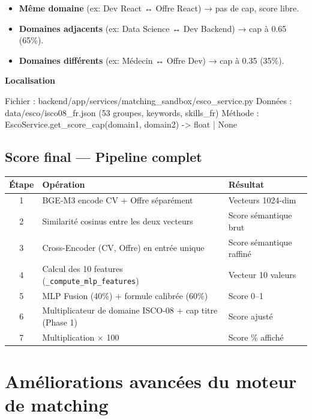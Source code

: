 \documentclass[12pt,a4paper]{report}
\newenvironment{codebox}[1][]{%
  \begin{framed}\noindent\textbf{\small\textcolor{codeblue}{#1}}\\[2pt]\ttfamily\small%
}{\end{framed}}
\begin{document}
\begin{itemize}
  \item \textbf{Même domaine} (ex: Dev React ↔ Offre React) → pas de cap, score libre.
  \item \textbf{Domaines adjacents} (ex: Data Science ↔ Dev Backend) → cap à 0.65 (65\%).
  \item \textbf{Domaines différents} (ex: Médecin ↔ Offre Dev) → cap à 0.35 (35\%).
\end{itemize}

\begin{codebox}[Localisation]
Fichier : backend/app/services/matching_sandbox/esco_service.py
Données : data/esco/isco08_fr.json (53 groupes, keywords, skills_fr)
Méthode : EscoService.get_score_cap(domain1, domain2) -> float | None
\end{codebox}

\section{Score final — Pipeline complet}

\begin{center}
\begin{tabular}{cll}
\toprule
\textbf{Étape} & \textbf{Opération} & \textbf{Résultat} \\
\midrule
1 & BGE-M3 encode CV + Offre séparément & Vecteurs 1024-dim \\
2 & Similarité cosinus entre les deux vecteurs & Score sémantique brut \\
3 & Cross-Encoder (CV, Offre) en entrée unique & Score sémantique raffiné \\
4 & Calcul des 10 features (\texttt{\_compute\_mlp\_features}) & Vecteur 10 valeurs \\
5 & MLP Fusion (40\%) + formule calibrée (60\%) & Score 0–1 \\
6 & Multiplicateur de domaine ISCO-08 + cap titre (Phase 1) & Score ajusté \\
7 & Multiplication × 100 & Score \% affiché \\
\bottomrule
\end{tabular}
\end{center}

\chapter{Améliorations avancées du moteur de matching}
\label{chap:ameliorations}
\end{document}
